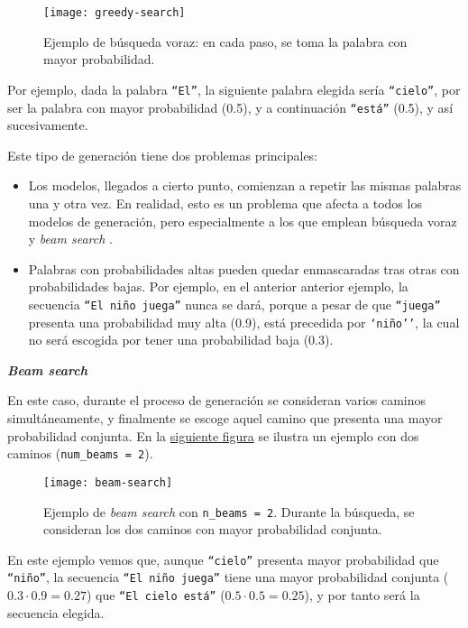 \begin{figure}[h]
	\centering
	\texttt{[image: greedy-search]}
	\caption{Ejemplo de búsqueda voraz: en cada paso, se toma la palabra con mayor probabilidad.}
\end{figure}


Por ejemplo, dada la palabra \texttt{``El''}, la siguiente palabra elegida sería \texttt{``cielo''}, por ser la palabra con mayor probabilidad (0.5), y a continuación \texttt{``está''} (0.5), y así sucesivamente.

Este tipo de generación tiene dos problemas principales:

\begin{itemize}
	\item [\textbullet] Los modelos, llegados a cierto punto, comienzan a repetir las mismas palabras una y otra vez. En realidad, esto es un problema que afecta a todos los modelos de generación, pero especialmente a los que emplean búsqueda voraz y \emph{beam search} \cite{vijayakumar16, shao17}.
	\item [\textbullet] Palabras con probabilidades altas pueden quedar enmascaradas tras otras con probabilidades bajas. Por ejemplo, en el anterior anterior ejemplo, la secuencia \texttt{``El niño juega''} nunca se dará, porque a pesar de que \texttt{``juega''} presenta una probabilidad muy alta (0.9), está precedida por \texttt{`niño''}, la cual no será escogida por tener una probabilidad baja (0.3).
\end{itemize}


\bigskip
\noindent
\textbf{\emph{Beam search}}

En este caso, durante el proceso de generación se consideran varios caminos simultáneamente, y finalmente se escoge aquel camino que presenta una mayor probabilidad conjunta. En la \hyperref[fig:beam-search]{siguiente figura} se ilustra un ejemplo con dos caminos (\texttt{num\_beams = 2}).

\begin{figure}[!h]
	\centering
	\texttt{[image: beam-search]}
	\caption{Ejemplo de \emph{beam search} con \texttt{n\_beams = 2}. Durante la búsqueda, se consideran los dos caminos con mayor probabilidad conjunta.}
	\label{fig:beam-search}
\end{figure}

En este ejemplo vemos que, aunque \texttt{``cielo''} presenta mayor probabilidad que \texttt{``niño''}, la secuencia \texttt{``El niño juega''} tiene una mayor probabilidad conjunta ($0.3 \cdot 0.9 = 0.27$) que \texttt{``El cielo está''} ($0.5 \cdot 0.5  = 0.25$), y por tanto será la secuencia elegida.


